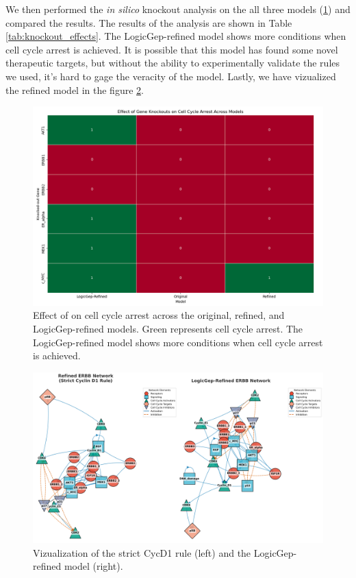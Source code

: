 \documentclass[a4paper,12pt]{article}
\begin{document}
We then performed the \textit{in silico} knockout analysis on the all three models (\ref{fig:logicgep_model_comparison}) and compared the results. The results of the analysis are shown in Table \ref{tab:knockout_effects}. The LogicGep-refined model shows more conditions when cell cycle arrest is achieved. It is possible that this model has found some novel therapeutic targets, but without the ability to experimentally validate the rules we used, it's hard to gage the veracity of the model. Lastly, we have vizualized the refined model in the figure \ref{fig:logicgep_model_vizualization}. 
\begin{figure}[!htbp]
    \centering
    \includegraphics[width=\textwidth]{images/logicgep_model_comparison.png}
    \caption{Effect of on cell cycle arrest across the original, refined, and LogicGep-refined models. Green represents cell cycle arrest. The LogicGep-refined model shows more conditions when cell cycle arrest is achieved.}
    \label{fig:logicgep_model_comparison}
\end{figure}

\begin{figure}[!htbp]
    \centering
    \includegraphics[width=\textwidth]{images/ERBB_logicgep_network.png}
    \caption{Vizualization of the strict CycD1 rule (left) and the LogicGep-refined model (right).}
    \label{fig:logicgep_model_vizualization}
\end{figure}
\end{document}

